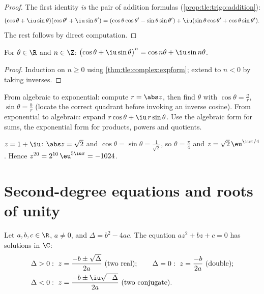 \begin{proof}
The first identity \emph{is} the pair of addition formulas
(\cref{prop:tle:trigo:addition}):
\[
(\cos\theta + \iu\sin\theta)(\cos\theta' + \iu\sin\theta')
= (\cos\theta\cos\theta' - \sin\theta\sin\theta')
+ \iu(\sin\theta\cos\theta' + \cos\theta\sin\theta').
\]
The rest follows by direct computation.
\end{proof}

\begin{corollary}\label{cor:tle:complex:demoivre}
For $\theta \in \R$ and $n \in \Z$:
$\bigl(\cos\theta + \iu\sin\theta\bigr)^n = \cos n\theta + \iu \sin n\theta$.
\end{corollary}

\begin{proof}
Induction on $n \geq 0$ using \cref{thm:tle:complex:expform}; extend to
$n < 0$ by taking inverses.
\end{proof}

\begin{method}\label{met:tle:complex:forms}
From algebraic to exponential: compute $r = \abs z$, then find $\theta$ with
$\cos\theta = \frac ar$, $\sin\theta = \frac br$ (locate the correct quadrant
before invoking an inverse cosine). From exponential to algebraic: expand
$r\cos\theta + \iu\, r\sin\theta$. Use the algebraic form for sums, the
exponential form for products, powers and quotients.
\end{method}

\begin{example}
$z = 1 + \iu$: $\abs z = \sqrt2$ and $\cos\theta = \sin\theta =
\frac{1}{\sqrt2}$, so $\theta = \frac\pi4$ and $z = \sqrt2\,\eu^{\iu\pi/4}$.
Hence $z^{20} = 2^{10}\,\eu^{5\iu\pi} = -1024$.
\end{example}

\section{Second-degree equations and roots of unity}

\begin{theorem}\label{thm:tle:complex:quadratic}
Let $a, b, c \in \R$, $a \neq 0$, and $\Delta = b^2 - 4ac$. The equation
$az^2 + bz + c = 0$ has solutions in $\C$:
\[
\begin{aligned}
&\Delta > 0:\ z = \frac{-b \pm \sqrt{\Delta}}{2a} \ (\text{two real}); \qquad
\Delta = 0:\ z = \frac{-b}{2a} \ (\text{double}); \\
&\Delta < 0:\ z = \frac{-b \pm \iu\sqrt{-\Delta}}{2a} \ (\text{two conjugate}).
\end{aligned}
\]
\end{theorem}

